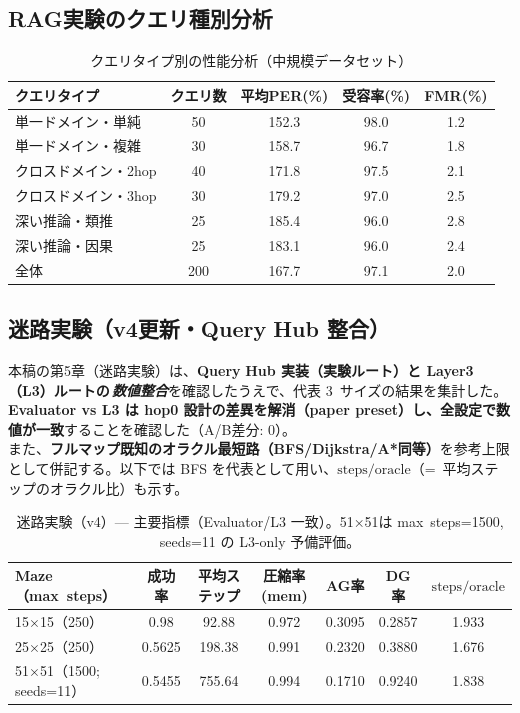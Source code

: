 \documentclass[ja=standard,xelatex]{bxjsarticle}
\begin{document}
\subsection{RAG実験のクエリ種別分析}

\begin{table}[H]
\centering
\caption{クエリタイプ別の性能分析（中規模データセット）}
\label{tab:query_type}
\small
\begin{tabular}{lcccc}
\toprule
クエリタイプ & クエリ数 & 平均PER(\%) & 受容率(\%) & FMR(\%) \\
\midrule
単一ドメイン・単純 & 50 & 152.3 & 98.0 & 1.2 \\
単一ドメイン・複雑 & 30 & 158.7 & 96.7 & 1.8 \\
クロスドメイン・2hop & 40 & 171.8 & 97.5 & 2.1 \\
クロスドメイン・3hop & 30 & 179.2 & 97.0 & 2.5 \\
深い推論・類推 & 25 & 185.4 & 96.0 & 2.8 \\
深い推論・因果 & 25 & 183.1 & 96.0 & 2.4 \\
\midrule
全体 & 200 & 167.7 & 97.1 & 2.0 \\
\bottomrule
\end{tabular}
\end{table}

\subsection{迷路実験（v4更新・Query\,\textendash\,Hub 整合）}\label{sec:maze_v4_update}
\noindent 本稿の第5章（迷路実験）は、\textbf{Query\,\textendash\,Hub 実装（実験ルート）と Layer3（L3）ルートの\,\emph{数値整合}}を確認したうえで、代表 3~サイズの結果を集計した。\textbf{Evaluator vs L3 は hop0 設計の差異を解消（paper preset）し、全設定で数値が一致}することを確認した（A/B差分: 0）。\\
\noindent また、\textbf{フルマップ既知のオラクル最短路（BFS/Dijkstra/A*同等）}を参考上限として併記する。以下では BFS を代表として用い、$\mathrm{steps}/\mathrm{oracle}$（=~平均ステップのオラクル比）も示す。

  \begin{table}[H]
  \centering
  \caption{迷路実験（v4）— 主要指標（Evaluator/L3 一致）。51×51は max~steps=1500, seeds=11 の L3-only 予備評価。}
  \label{tab:maze_v4_main}
  \small
  \begin{tabular}{lcccccc}
    \toprule
    Maze（max~steps） & 成功率 & 平均ステップ & 圧縮率(mem) & AG率 & DG率 & $\mathrm{steps}/\mathrm{oracle}$ \\
    \midrule
    15$\times$15（250） & 0.98 & 92.88 & 0.972 & 0.3095 & 0.2857 & 1.933 \\
    25$\times$25（250） & 0.5625 & 198.38 & 0.991 & 0.2320 & 0.3880 & 1.676 \\
    51$\times$51（1500; seeds=11） & 0.5455 & 755.64 & 0.994 & 0.1710 & 0.9240 & 1.838 \\
    \bottomrule
  \end{tabular}
  \end{table}
  
\end{document}
